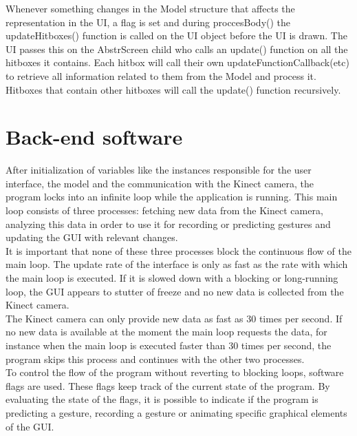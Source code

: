 Whenever something changes in the Model structure that affects the representation in the UI, a flag is set and during proccesBody() the updateHitboxes() function is called on the UI object before the UI is drawn. The UI passes this on the Abstr\textunderscore Screen child who calls an update() function on all the hitboxes it contains. Each hitbox will call their own updateFunctionCallback(etc) to retrieve all information related to them from the Model and process it. Hitboxes that contain other hitboxes will call the update() function recursively.




\section{Back-end software}

After initialization of variables like the instances responsible for the user interface, the model and the communication with the Kinect camera, the program locks into an infinite loop while the application is running. This main loop consists of three processes: fetching new data from the Kinect camera, analyzing this data in order to use it for recording or predicting gestures and updating the GUI with relevant changes.\\

It is important that none of these three processes block the continuous flow of the main loop. The update rate of the interface is only as fast as the rate with which the main loop is executed. If it is slowed down with a blocking or long-running loop, the GUI appears to stutter of freeze and no new data is collected from the Kinect camera.\\

The Kinect camera can only provide new data as fast as 30 times per second. If no new data is available at the moment the main loop requests the data, for instance when the main loop is executed faster than 30 times per second, the program skips this process and continues with the other two processes.\\

To control the flow of the program without reverting to blocking loops, software flags are used. These flags keep track of the current state of the program. By evaluating the state of the flags, it is possible to indicate if the program is predicting a gesture, recording a gesture or animating specific graphical elements of the GUI.


